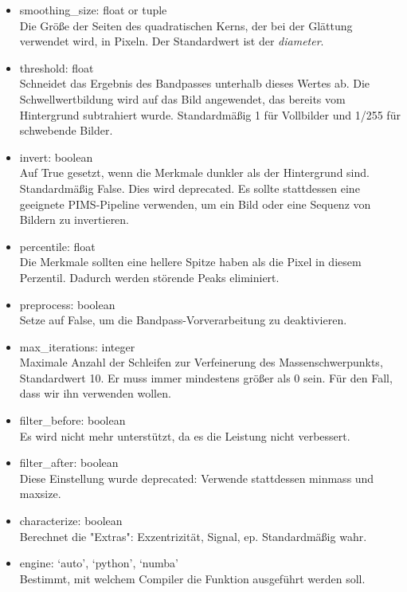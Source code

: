 \begin{itemize}\label{non_working_param}
				\item smoothing\_size: float or tuple\\
				Die Größe der Seiten des quadratischen Kerns, der bei der Glättung verwendet wird, in Pixeln. Der Standardwert ist der \textit{diameter}.
				
				\item threshold: float\\
				Schneidet das Ergebnis des Bandpasses unterhalb dieses Wertes ab. Die Schwellwertbildung wird auf das Bild angewendet, das bereits vom Hintergrund subtrahiert wurde. Standardmäßig 1 für Vollbilder und 1/255 für schwebende Bilder.
				
				\item invert: boolean\\
				Auf True gesetzt, wenn die Merkmale dunkler als der Hintergrund sind. Standardmäßig False.
				Dies wird deprecated. Es sollte stattdessen eine geeignete PIMS-Pipeline verwenden, um ein Bild oder eine Sequenz von Bildern zu invertieren.
				
				
				\item percentile: float\\
				Die Merkmale sollten eine hellere Spitze haben als die Pixel in diesem Perzentil. Dadurch werden störende Peaks eliminiert.
				
				\item preprocess: boolean\\
    			Setze auf False, um die Bandpass-Vorverarbeitung zu deaktivieren.
    			
				\item max\_iterations: integer\\
    			Maximale Anzahl der Schleifen zur Verfeinerung des Massenschwerpunkts, Standardwert 10. Er muss immer mindestens größer als 0 sein. Für den Fall, dass wir ihn verwenden wollen.
    			
				\item filter\_before: boolean\\
				Es wird nicht mehr unterstützt, da es die Leistung nicht verbessert.
				
    			\item filter\_after: boolean\\
    			Diese Einstellung wurde deprecated: Verwende stattdessen minmass und maxsize.
    			
    			\item characterize: boolean\\
    			Berechnet die "Extras": Exzentrizität, Signal, ep. Standardmäßig wahr.
    			
    			\item engine: {‘auto’, ‘python’, ‘numba’}\\
    			Bestimmt, mit welchem Compiler die Funktion ausgeführt werden soll.			

\end{itemize}
    					

